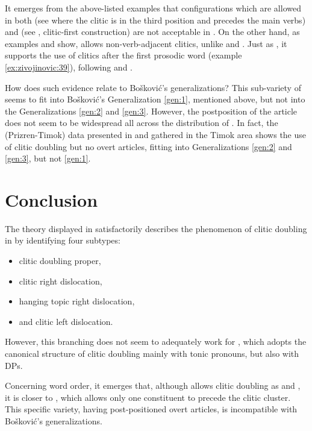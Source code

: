 \documentclass[output=paper,
colorlinks,
citecolor=brown,
newtxmath
]{langscibook}
\begin{document}
\noindent It emerges from the above-listed examples that configurations which are allowed in both  (see  where the clitic is in the third position and precedes the main verbs) and  (see , clitic-first construction) are not acceptable in . On the other hand, as examples  and  show,  allows non-verb-adjacent clitics, unlike  and . Just as , it supports the use of clitics after the first prosodic word (example \ref{ex:zivojinovic:39}), following \citet{Boskovic2001} and \citet{Radanovic-Kocic1988}.

How does such evidence relate to Bošković’s generalizations? This sub-variety of  seems to fit into Bošković’s Generalization \ref{gen:1}, mentioned above, but not into the Generalizations \ref{gen:2} and \ref{gen:3}. However, the postposition of the article does not seem to be widespread all across the distribution of . In fact, the  (Prizren-Timok) data presented in \citet{Runic2014} and gathered in the Timok area shows the use of clitic doubling but no overt articles, fitting into Generalizations \ref{gen:2} and \ref{gen:3}, but not \ref{gen:1}.
%
%
\section{Conclusion}
\label{sec:conclusion}

The theory displayed in \citet{Cinque.Krapova2008} satisfactorily describes the phenomenon of clitic doubling in  by identifying four subtypes:
\begin{itemize}
\item clitic doubling proper,
\item clitic right dislocation,
\item hanging topic right dislocation,
\item and clitic left dislocation.
\end{itemize}
However, this branching does not seem to adequately work for , which adopts the canonical structure of clitic doubling mainly with tonic pronouns, but also with DPs.

Concerning word order, it emerges that, although  allows clitic doubling as  and , it is closer to , which allows only one constituent to precede the clitic cluster. This specific variety, having post-positioned overt articles, is incompatible with Bošković’s generalizations.
\end{document}
